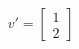\documentclass[preview]{standalone}
\begin{document}
\begin{align*}
v'=\begin{bmatrix}
                    1\\
                    2
                    \end{bmatrix}\\
\end{align*}
\end{document}
